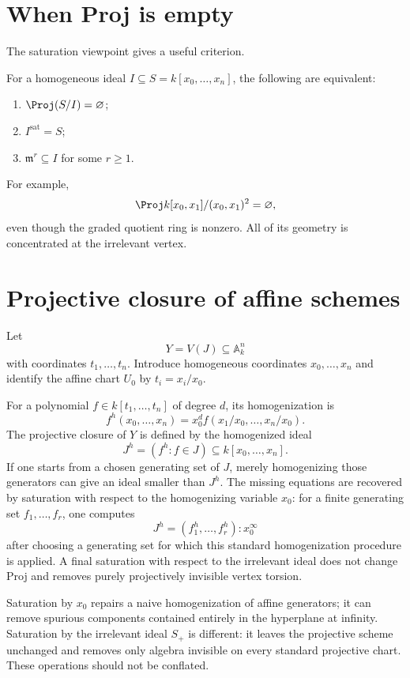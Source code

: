 

\section{When Proj is empty}
The saturation viewpoint gives a useful criterion.

\begin{proposition}\label{prop:vi37-empty}
For a homogeneous ideal \(I\subseteq S=k[x_0,\ldots,x_n]\), the following are equivalent:
\begin{enumerate}[label=(\roman*)]
\item \(\Proj(S/I)=\varnothing\);
\item \(I^{\mathrm{sat}}=S\);
\item \(\mathfrak m^r\subseteq I\) for some \(r\ge1\).
\end{enumerate}
\end{proposition}

For example,
\[
  \Proj k[x_0,x_1]/(x_0,x_1)^2=\varnothing,
\]
even though the graded quotient ring is nonzero.  All of its geometry is concentrated at the irrelevant vertex.

\section{Projective closure of affine schemes}
Let
\[
  Y=V(J)\subseteq\mathbb A^n_k
\]
with coordinates \(t_1,\ldots,t_n\).  Introduce homogeneous coordinates \(x_0,\ldots,x_n\) and identify the affine chart \(U_0\) by \(t_i=x_i/x_0\).

For a polynomial \(f\in k[t_1,\ldots,t_n]\) of degree \(d\), its homogenization is
\[
  f^h(x_0,\ldots,x_n)
  =x_0^d f(x_1/x_0,\ldots,x_n/x_0).
\]
The projective closure of \(Y\) is defined by the homogenized ideal
\[
  J^h=(f^h:f\in J)\subseteq k[x_0,\ldots,x_n].
\]
If one starts from a chosen generating set of \(J\), merely homogenizing those generators can give an ideal smaller than \(J^h\).  The missing equations are recovered by saturation with respect to the homogenizing variable \(x_0\): for a finite generating set \(f_1,\ldots,f_r\), one computes
\[
  J^h=(f_1^h,\ldots,f_r^h):x_0^\infty
\]
after choosing a generating set for which this standard homogenization procedure is applied.  A final saturation with respect to the irrelevant ideal does not change Proj and removes purely projectively invisible vertex torsion.

\begin{remark}
Saturation by \(x_0\) repairs a naive homogenization of affine generators; it can remove spurious components contained entirely in the hyperplane at infinity.  Saturation by the irrelevant ideal \(S_+\) is different: it leaves the projective scheme unchanged and removes only algebra invisible on every standard projective chart.  These operations should not be conflated.
\end{remark}

